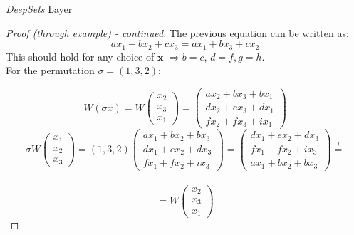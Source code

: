 \documentclass{beamer}
\begin{document}
\begin{frame}{\emph{DeepSets} Layer}
    \renewcommand{\qedsymbol}{} 
    \begin{proof}[Proof (through example) - continued]
        {\footnotesize
        The previous equation can be written as:
        \[ax_1 + bx_2 + cx_3 = ax_1 + bx_3 + cx_2\]
        This should hold for any choice of $\mathbf{x}$ $\Rightarrow b = c$, $d=f, g=h$. \\
        \pause
        For the permutation $\sigma = (1,3,2)$:  
        
        \[W(\sigma x) = W \begin{pmatrix}
            x_2 \\
            x_3 \\
            x_1
        \end{pmatrix} = 
        \begin{pmatrix}
            ax_2 + bx_3 + bx_1 \\
            dx_2 + ex_3 + dx_1 \\
            fx_2 + fx_3 + ix_1
        \end{pmatrix}\]
        \[
        \sigma W \begin{pmatrix}
            x_1 \\
            x_2 \\
            x_3
        \end{pmatrix} = (1,3, 2) \begin{pmatrix}
            ax_1 + bx_2 + bx_3 \\
            dx_1 + ex_2 + dx_3 \\
            fx_1 + fx_2 + ix_3
        \end{pmatrix} = \begin{pmatrix}
            dx_1 + ex_2 + dx_3 \\
            fx_1 + fx_2 + ix_3 \\
            ax_1 + bx_2 + bx_3
        \end{pmatrix} \stackrel{!}{=} \] \\
        \[ = W \begin{pmatrix}
            x_2 \\
            x_3 \\
            x_1
        \end{pmatrix}
        \]
        }
    \end{proof}
    \renewcommand{\qedsymbol}{\ensuremath{\square}} 
\end{frame}
\end{document}
